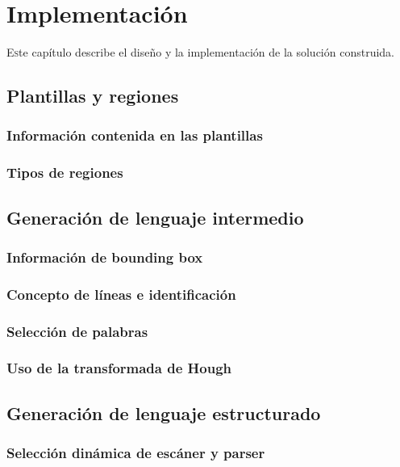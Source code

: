 
\chapter{Implementación}
\label{chap:implemetación}

\lettrine{E}ste capítulo describe el diseño y la implementación de la solución construida.

\section{Plantillas y regiones}
\subsection{Información contenida en las plantillas}
\subsection{Tipos de regiones}

\section{Generación de lenguaje intermedio}
\subsection{Información de bounding box}
\subsection{Concepto de líneas e identificación}
\subsection{Selección de palabras}
\subsection{Uso de la transformada de Hough}

\section{Generación de lenguaje estructurado}
\subsection{Selección dinámica de escáner y parser}
